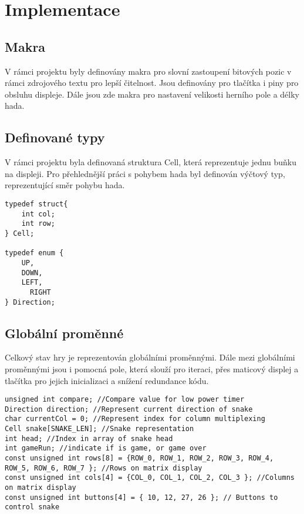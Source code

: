 \documentclass[12pt,english]{article}
\begin{document}
\section{Implementace}
\subsection{Makra}
V rámci projektu byly definovány makra pro slovní zastoupení bitových pozic v rámci zdrojového textu pro lepší čitelnost. Jsou definovány pro tlačítka i piny pro obsluhu displeje. Dále jsou zde makra pro nastavení velikosti herního pole a délky hada.

\subsection{Definované typy}
V rámci projektu byla definovaná struktura Cell, která reprezentuje jednu buňku na displeji. Pro přehlednější práci s pohybem hada byl definován výčtový typ, reprezentující směr pohybu hada.
\begin{lstlisting}[style=CStyle]
typedef struct{
	int col;
	int row;
} Cell;

typedef enum { 
    UP,
    DOWN,
    LEFT,
	  RIGHT
} Direction;

\end{lstlisting}

\subsection{Globální proměnné}
Celkový stav hry je reprezentován globálními proměnnými. Dále mezi globálními proměnnými jsou i pomocná pole, která slouží pro iteraci, přes maticový displej a tlačítka pro jejich inicializaci a snížení redundance kódu.

\begin{lstlisting}[style=CStyle]
unsigned int compare; //Compare value for low power timer
Direction direction; //Represent current direction of snake
char currentCol = 0; //Represent index for column multiplexing
Cell snake[SNAKE_LEN]; //Snake representation
int head; //Index in array of snake head
int gameRun; //indicate if is game, or game over 
const unsigned int rows[8] = {ROW_0, ROW_1, ROW_2, ROW_3, ROW_4, ROW_5, ROW_6, ROW_7 }; //Rows on matrix display
const unsigned int cols[4] = {COL_0, COL_1, COL_2, COL_3 }; //Columns on matrix display
const unsigned int buttons[4] = { 10, 12, 27, 26 }; // Buttons to control snake
\end{lstlisting}
\end{document}
